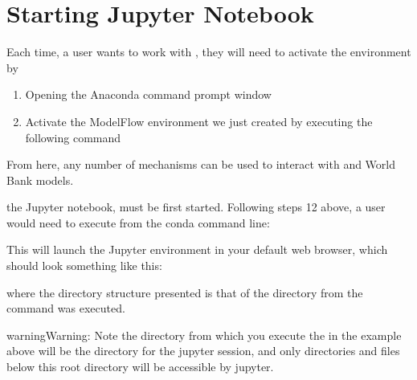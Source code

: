 \documentclass[letterpaper,10pt,english]{jupyterBook}
\begin{document}
\section{Starting Jupyter Notebook}
\label{\detokenize{content/04_PythonEssentials/Intro_Jupyter_notebook:starting-jupyter-notebook}}
\sphinxAtStartPar
Each time, a user wants to work with , they will need to activate the  environment by
\begin{enumerate}
%
\item {} 
\sphinxAtStartPar
Opening the Anaconda command prompt window

\item {} 
\sphinxAtStartPar
Activate the ModelFlow environment we just created by executing the following command

\end{enumerate}

\sphinxAtStartPar
{}

\sphinxAtStartPar
From here, any number of mechanisms can be used to interact with  and World Bank models.

\sphinxAtStartPar
{} the Jupyter notebook, must be first started.  Following steps 1\sphinxhyphen{}2 above, a user would need to execute from the conda command line:

\sphinxAtStartPar
{}

\sphinxAtStartPar
This will launch the Jupyter environment in your default web browser, which should look something like this:

\sphinxAtStartPar
{}

\sphinxAtStartPar
where the directory structure presented is that of the directory from the  command was executed.

\begin{sphinxadmonition}{warning}{Warning:}
\sphinxAtStartPar
Note the directory from which you execute the   in the example above will be the  directory for the jupyter session, and only directories and files below this root directory will be accessible by jupyter.
\end{sphinxadmonition}
\end{document}
